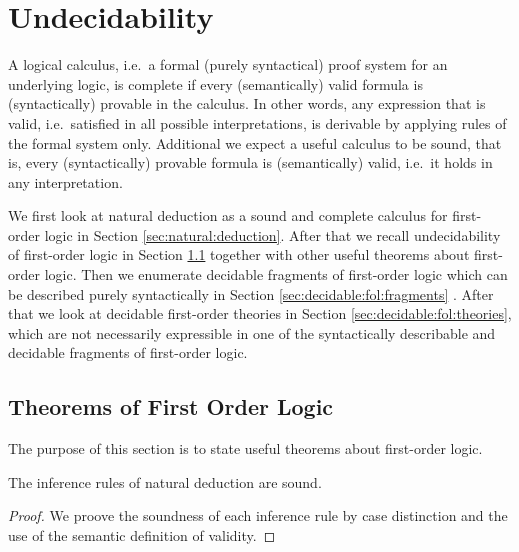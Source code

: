

\chapter{Undecidability}

A logical calculus, i.e.~a formal (purely syntactical) proof system for an underlying logic, 
is {\myem complete} if every (semantically) valid formula is (syntactically) provable in the calculus.
In other words, any expression that is valid, i.e.~satisfied in all possible interpretations, 
is derivable by applying rules of the formal system only.
Additional we expect a useful calculus to be {\myem sound}, that is, 
every (syntactically) provable formula is (semantically) valid, 
i.e.~it holds in any interpretation.



We first look at natural deduction as a sound and complete calculus 
for first-order logic in Section \ref{sec:natural:deduction}.
After that we recall undecidability of first-order logic in Section \ref{sec:decidable:fol:theorems} 
together with other useful theorems about first-order logic.
Then we enumerate decidable fragments of first-order logic
which can be described purely syntactically in Section \ref{sec:decidable:fol:fragments} .
After that we look at decidable first-order theories in Section \ref{sec:decidable:fol:theories}, 
which are not necessarily expressible 
in one of the syntactically describable and decidable fragments of first-order logic.


\section{Theorems of First Order Logic}\label{sec:decidable:fol:theorems}

The purpose of this section is to state useful theorems about first-order logic.

\begin{theorem}[Soundness]
	The inference rules of natural deduction are sound.
\end{theorem}

\begin{proof}
	We proove the soundness of each inference rule by case distinction and the use of the semantic definition of validity.
\end{proof}

